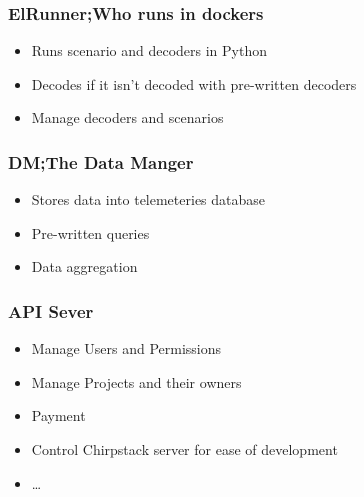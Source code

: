 \documentclass{../iot-lecture}
\begin{document}
\begin{frame}
  \frametitle{ElRunner;\@ Who runs in dockers}
  \begin{itemize}
    \item Runs scenario and decoders in Python
    \item Decodes if it isn't decoded with pre-written decoders
    \item Manage decoders and scenarios
  \end{itemize}
\end{frame}

\begin{frame}
  \frametitle{DM;\@ The Data Manger}
  \begin{itemize}
    \item Stores data into telemeteries database
    \item Pre-written queries
    \item Data aggregation
  \end{itemize}
\end{frame}

\begin{frame}
  \frametitle{API Sever}
  \begin{itemize}
    \item Manage Users and Permissions
    \item Manage Projects and their owners
    \item Payment
    \item Control Chirpstack server for ease of development
    \item \ldots
  \end{itemize}
\end{frame}
\end{document}
